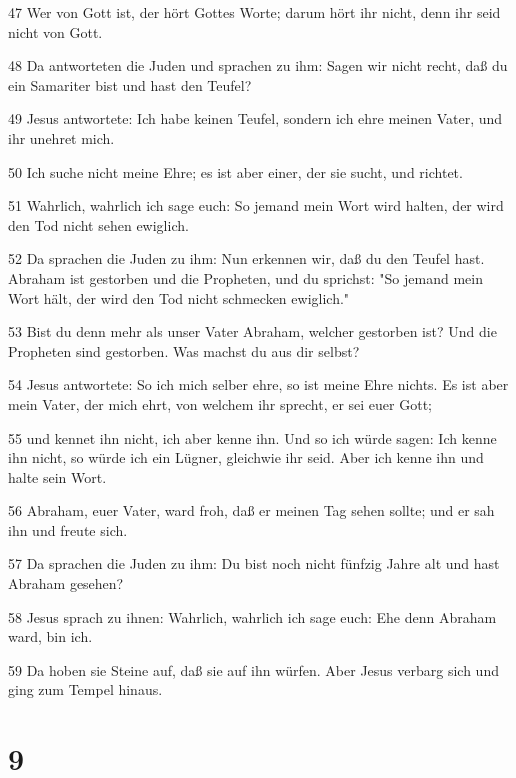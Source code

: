 \par 47 Wer von Gott ist, der hört Gottes Worte; darum hört ihr nicht, denn ihr seid nicht von Gott.
\par 48 Da antworteten die Juden und sprachen zu ihm: Sagen wir nicht recht, daß du ein Samariter bist und hast den Teufel?
\par 49 Jesus antwortete: Ich habe keinen Teufel, sondern ich ehre meinen Vater, und ihr unehret mich.
\par 50 Ich suche nicht meine Ehre; es ist aber einer, der sie sucht, und richtet.
\par 51 Wahrlich, wahrlich ich sage euch: So jemand mein Wort wird halten, der wird den Tod nicht sehen ewiglich.
\par 52 Da sprachen die Juden zu ihm: Nun erkennen wir, daß du den Teufel hast. Abraham ist gestorben und die Propheten, und du sprichst: "So jemand mein Wort hält, der wird den Tod nicht schmecken ewiglich."
\par 53 Bist du denn mehr als unser Vater Abraham, welcher gestorben ist? Und die Propheten sind gestorben. Was machst du aus dir selbst?
\par 54 Jesus antwortete: So ich mich selber ehre, so ist meine Ehre nichts. Es ist aber mein Vater, der mich ehrt, von welchem ihr sprecht, er sei euer Gott;
\par 55 und kennet ihn nicht, ich aber kenne ihn. Und so ich würde sagen: Ich kenne ihn nicht, so würde ich ein Lügner, gleichwie ihr seid. Aber ich kenne ihn und halte sein Wort.
\par 56 Abraham, euer Vater, ward froh, daß er meinen Tag sehen sollte; und er sah ihn und freute sich.
\par 57 Da sprachen die Juden zu ihm: Du bist noch nicht fünfzig Jahre alt und hast Abraham gesehen?
\par 58 Jesus sprach zu ihnen: Wahrlich, wahrlich ich sage euch: Ehe denn Abraham ward, bin ich.
\par 59 Da hoben sie Steine auf, daß sie auf ihn würfen. Aber Jesus verbarg sich und ging zum Tempel hinaus.

\chapter{9}

